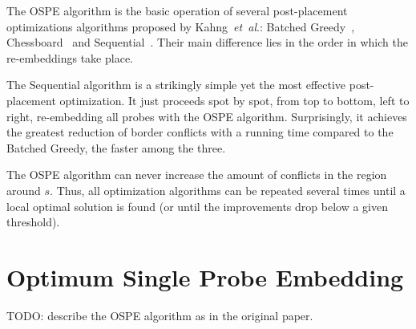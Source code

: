 \documentclass{llncs}
\newcommand{\ignore}[1]{}
\begin{document}
The OSPE algorithm is the basic operation of several post-placement optimizations
algorithms proposed by Kahng~{\it et~al}.: Batched Greedy~\cite{KAHNG02},
Chessboard~\cite{KAHNG02} and Sequential~\cite{KAHNG03B}. Their main difference lies in
the order in which the re-embeddings take place.

\ignore{
The first algorithm is a simple greedy approach that computes, for each spot of the chip,
the maximum reduction of conflicts that could be achieved by re-embedding its probe with
the OSPE algorithm. It then greedily selects the spot with higher gain and re-embeds
its probe optimally in regards to its neighbors, updating the gains of affected
spots. A faster version, called Batched Greedy, sacrifices its greedy nature by postponing
the update of gains and re-embedding all probes that have not been affected by the
re-embeddings performed in the current iteration.

The Chessboard optimization is based on the fact that a chip can be bi-colored
just like a chessboard, in such a way that the embeddings of probes located on
white spots, with respect to border length, are independent of those placed on black spots,
and vice-versa. The Chessboard uses this coloring to alternate the optimal re-embedding
of probes located on black and white spots.
}

The Sequential algorithm is a strikingly simple yet the most effective post-placement
optimization. It just proceeds spot by spot, from top to bottom, left to right,
re-embedding all probes with the OSPE algorithm. Surprisingly, it achieves the greatest
reduction of border conflicts with a running time compared to the Batched Greedy,
the faster among the three.

The OSPE algorithm can never increase the amount of conflicts in the region
around $s$. Thus, all optimization algorithms can be repeated several times until
a local optimal solution is found (or until the improvements drop below a given threshold).

\section{Optimum Single Probe Embedding}
\label{sec:ospe}

TODO: describe the OSPE algorithm as in the original paper.

\end{document}
